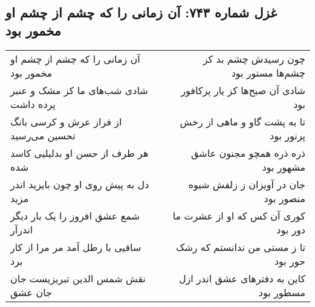 \begin{center}
\section*{غزل شماره ۷۴۳: آن زمانی را که چشم از چشم او مخمور بود}
\label{sec:0743}
\begin{longtable}{l p{0.5cm} r}
آن زمانی را که چشم از چشم او مخمور بود
&&
چون رسیدش چشم بد کز چشم‌ها مستور بود
\\
شادی شب‌های ما کز مشک و عنبر پرده داشت
&&
شادی آن صبح‌ها کز یار پرکافور بود
\\
از فراز عرش و کرسی بانگ تحسین می‌رسید
&&
تا به پشت گاو و ماهی از رخش پرنور بود
\\
هر طرف از حسن او بدلیلیی کاسد شده
&&
ذره ذره همچو مجنون عاشق مشهور بود
\\
دل به پیش روی او چون بایزید اندر مزید
&&
جان در آویزان ز زلفش شیوه منصور بود
\\
شمع عشق افروز را یک بار دیگر اندرآر
&&
کوری آن کس که او از عشرت ما دور بود
\\
ساقیی با رطل آمد مر مرا از کار برد
&&
تا ز مستی من ندانستم که رشک حور بود
\\
نقش شمس الدین تبریزیست جان جان عشق
&&
کاین به دفترهای عشق اندر ازل مسطور بود
\\
\end{longtable}
\end{center}
